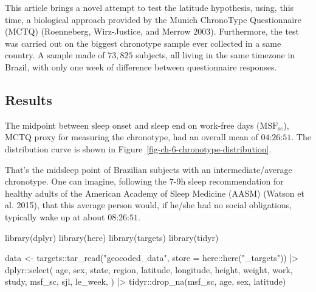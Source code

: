 \documentclass[
  12pt,
  a4paper,
  oneside]{tesesusp}
\newenvironment{Shaded}{\begin{snugshade}}{\end{snugshade}}
\newcommand{\AttributeTok}[1]{\textcolor[rgb]{0.40,0.45,0.13}{#1}}
\newcommand{\FunctionTok}[1]{\textcolor[rgb]{0.28,0.35,0.67}{#1}}
\newcommand{\NormalTok}[1]{\textcolor[rgb]{0.00,0.23,0.31}{#1}}
\newcommand{\OtherTok}[1]{\textcolor[rgb]{0.00,0.23,0.31}{#1}}
\newcommand{\SpecialCharTok}[1]{\textcolor[rgb]{0.37,0.37,0.37}{#1}}
\newcommand{\StringTok}[1]{\textcolor[rgb]{0.13,0.47,0.30}{#1}}
\begin{document}
This article brings a novel attempt to test the latitude hypothesis,
using, this time, a biological approach provided by the Munich
ChronoType Questionnaire (MCTQ) (Roenneberg, Wirz-Justice, and Merrow
2003). Furthermore, the test was carried out on the biggest chronotype
sample ever collected in a same country. A sample made of \(73,825\)
subjects, all living in the same timezone in Brazil, with only one week
of difference between questionnaire responses.

\hypertarget{results}{%
\subsection{Results}\label{results}}

The midpoint between sleep onset and sleep end on work-free days
(\(\text{MSF}_{\text{sc}}\)), MCTQ proxy for measuring the chronotype,
had an overall mean of \(\text{04:26:51}\). The distribution curve is
shown in Figure~\ref{fig-ch-6-chronotype-distribution}.

That's the midsleep point of Brazilian subjects with an
intermediate/average chronotype. One can imagine, following the 7-9h
sleep recommendation for healthy adults of the American Academy of Sleep
Medicine (AASM) (Watson et al. 2015), that this average person would, if
he/she had no social obligations, typically wake up at about
\(\text{08:26:51}\).

\begin{Shaded}
\begin{Highlighting}[numbers=left,,]
\FunctionTok{library}\NormalTok{(dplyr)}
\FunctionTok{library}\NormalTok{(here)}
\FunctionTok{library}\NormalTok{(targets)}
\FunctionTok{library}\NormalTok{(tidyr)}

\NormalTok{data }\OtherTok{\textless{}{-}} 
\NormalTok{  targets}\SpecialCharTok{::}\FunctionTok{tar\_read}\NormalTok{(}\StringTok{"geocoded\_data"}\NormalTok{, }\AttributeTok{store =}\NormalTok{ here}\SpecialCharTok{::}\FunctionTok{here}\NormalTok{(}\StringTok{"\_targets"}\NormalTok{)) }\SpecialCharTok{|\textgreater{}}
\NormalTok{  dplyr}\SpecialCharTok{::}\FunctionTok{select}\NormalTok{(}
\NormalTok{    age, sex, state, region, latitude, longitude, height, weight, work, study,}
\NormalTok{    msf\_sc, sjl, le\_week, }
\NormalTok{    ) }\SpecialCharTok{|\textgreater{}}
\NormalTok{  tidyr}\SpecialCharTok{::}\FunctionTok{drop\_na}\NormalTok{(msf\_sc, age, sex, latitude)}
\end{Highlighting}
\end{Shaded}
\end{document}

